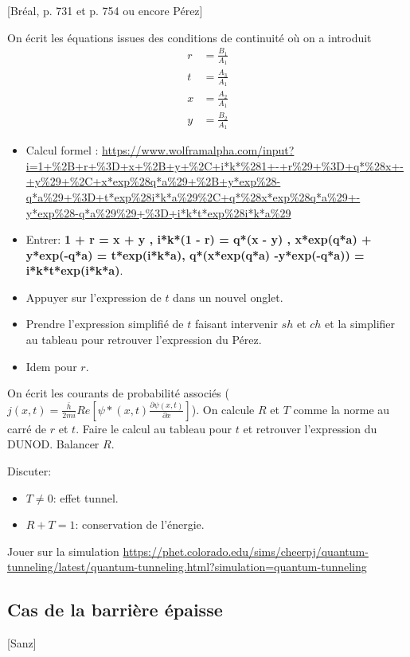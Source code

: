 \documentclass[11pt]{report}
\numberwithin{figure}{section}
\numberwithin{equation}{section}
\numberwithin{table}{section}
\newcommand{\1}{\boldsymbol{1}}
\begin{document}
[Bréal, p. 731 et p. 754 ou encore Pérez]

On écrit les équations issues des conditions de continuité où on a introduit
\begin{align*}
r &= \frac{B_1}{A_1} \\
t & = \frac{A_3}{A_1} \\
x &= \frac{A_2}{A_1} \\
y &= \frac{ B_2}{A_1}
\end{align*}
\begin{itemize}
\item Calcul formel : \url{https://www.wolframalpha.com/input?i=1+%2B+r+%3D+x+%2B+y+%2C+i*k*%281+-+r%29+%3D+q*%28x+-+y%29+%2C+x*exp%28q*a%29+%2B+y*exp%28-q*a%29+%3D+t*exp%28i*k*a%29%2C+q*%28x*exp%28q*a%29+-y*exp%28-q*a%29%29+%3D+i*k*t*exp%28i*k*a%29} \\
\item Entrer: \textbf{1 + r = x + y , i*k*(1 - r) = q*(x - y) , x*exp(q*a) + y*exp(-q*a) = t*exp(i*k*a), q*(x*exp(q*a) -y*exp(-q*a)) = i*k*t*exp(i*k*a)}.
\item Appuyer sur l'expression de $t$ dans un nouvel onglet.
\item Prendre l'expression simplifié de $t$ faisant intervenir $sh$ et $ch$ et la simplifier au tableau pour retrouver l'expression du Pérez.
\item Idem pour $r$.
\end{itemize}

On écrit les courants de probabilité associés ($j(x,t) = \frac{\bar{h}}{2mi} Re[\psi*(x,t) \frac{\partial \psi(x,t)}{\partial x}]$). On calcule $R$ et $T$ comme la norme au carré de $r$ et $t$. Faire le calcul au tableau pour $t$ et retrouver l'expression du DUNOD. Balancer $R$.

Discuter:
\begin{itemize}
\item $T \neq 0$: effet tunnel.
\item $R+T = 1$: conservation de l'énergie.
\end{itemize}

Jouer sur la simulation \url{https://phet.colorado.edu/sims/cheerpj/quantum-tunneling/latest/quantum-tunneling.html?simulation=quantum-tunneling}

\subsection{Cas de la barrière épaisse}

[Sanz]
\end{document}
